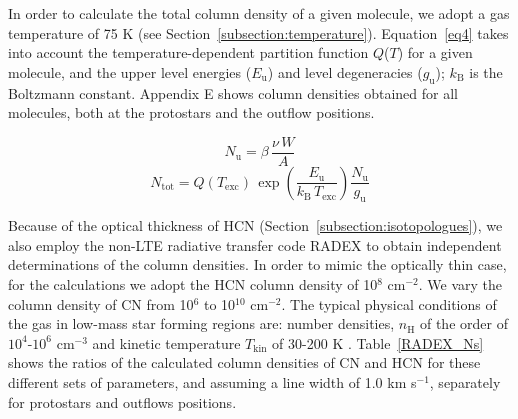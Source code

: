 \documentclass{aa}
\begin{document}
In order to calculate the total column density of a given molecule, 
we adopt a gas temperature of 75 K (see Section~\ref{subsection:temperature}). Equation~\ref{eq4} takes into account the 
temperature-dependent partition function $Q$($T$) for a given molecule, and 
the upper level energies ($E_\mathrm{u}$) and level degeneracies ($g_\mathrm{u}$);
$k_\mathrm{B}$ is the Boltzmann constant. Appendix E shows column densities obtained for all molecules, both at the protostars and the outflow positions.


\begin{equation} 
\label{eq3} N_\mathrm{u} = \beta \, \frac{\nu \,W}{A} 
\end{equation} 
\begin{equation} 
\label{eq4} N_\mathrm{tot} = Q(T_\mathrm{exc}) \, \exp(\frac{E_\mathrm{u}}{k_\mathrm{B} \, T_\mathrm{exc}}) \frac{N_\mathrm{u} }{g_\mathrm{u} } 
\end{equation} 

Because of the optical thickness of HCN (Section~\ref{subsection:isotopologues}), we also employ the non-LTE radiative transfer code RADEX 
to obtain independent determinations of the column densities. In order to mimic the optically thin case,
for the calculations we adopt the HCN column density of 10$^8$ cm$^{-2}$. We vary the column density 
of CN from 10$^6$ to 10$^{10}$ cm$^{-2}$. The typical physical conditions of the gas 
in low-mass star forming regions are: number densities, $n_\mathrm{H}$ of the order of $10^{4}$-$10^{6}$ cm$^{-3}$ 
and kinetic temperature $T_\mathrm{kin}$ of 30-200 K \citep{Mot14}. Table~\ref{RADEX_Ns} shows the ratios of the calculated 
column densities of CN and HCN for these different sets of parameters, and assuming a line width of 1.0 km s$^{-1}$, separately for protostars and outflows positions.
\end{document}
